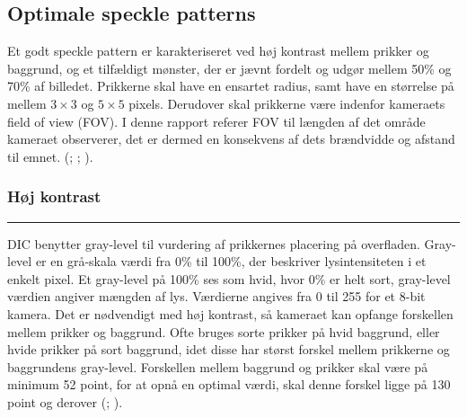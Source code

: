 \subsection{Optimale speckle patterns} \label{Optimale speckle patterns}

Et godt speckle pattern er karakteriseret ved høj kontrast mellem prikker og baggrund, og et tilfældigt mønster, der er jævnt fordelt og udgør mellem 50\% og 70\% af billedet. Prikkerne skal have en ensartet radius, samt have en størrelse på mellem $3\times3$ og $5\times5$ pixels. Derudover skal prikkerne være indenfor kameraets field of view (FOV). I denne rapport referer FOV til længden af det område kameraet observerer, det er dermed en konsekvens af dets brændvidde og afstand til emnet. (\cite{Dong2017ACorrelation}; \cite{Su2022Glare:Pattern}; \cite{Gagnon2024ThePatterns}).  


\subsubsection{Høj kontrast}\plainbreak{-0.4} 
DIC benytter gray-level til vurdering af prikkernes placering på overfladen. Gray-level er en grå-skala værdi fra 0\% til 100\%, der beskriver lysintensiteten i et enkelt pixel. Et gray-level på 100\% ses som hvid, hvor 0\% er helt sort, gray-level værdien angiver mængden af lys. Værdierne angives fra 0 til 255 for et 8-bit kamera. Det er nødvendigt med høj kontrast, så kameraet kan opfange forskellen mellem prikker og baggrund. Ofte bruges sorte prikker på hvid baggrund, eller hvide prikker på sort baggrund, idet disse har størst forskel mellem prikkerne og baggrundens gray-level. Forskellen mellem baggrund og prikker skal være på minimum 52 point, for at opnå en optimal værdi, skal denne forskel ligge på 130 point og derover (\cite{Reu2015AllContrast}; \cite{Bigger2018ACorrelation}).


\newpage

